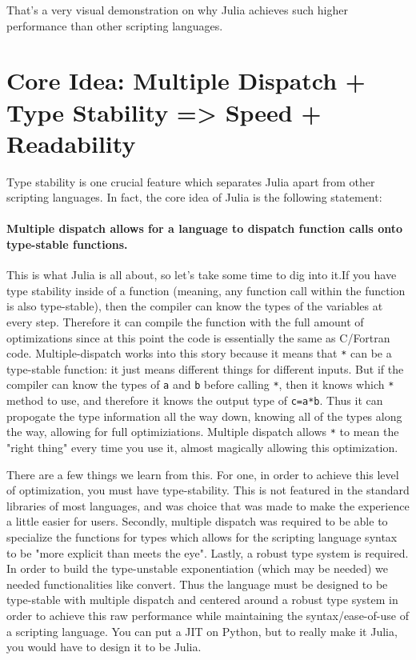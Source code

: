 \documentclass[11pt]{article}
\begin{document}
    That's a very visual demonstration on why Julia achieves such higher
performance than other scripting languages.

    \section{Core Idea: Multiple Dispatch + Type Stability =\textgreater{}
Speed +
Readability}\label{core-idea-multiple-dispatch-type-stability-speed-readability}

Type stability is one crucial feature which separates Julia apart from
other scripting languages. In fact, the core idea of Julia is the
following statement:

\paragraph{Multiple dispatch allows for a language to dispatch function
calls onto type-stable
functions.}\label{multiple-dispatch-allows-for-a-language-to-dispatch-function-calls-onto-type-stable-functions.}

This is what Julia is all about, so let's take some time to dig into
it.If you have type stability inside of a function (meaning, any
function call within the function is also type-stable), then the
compiler can know the types of the variables at every step. Therefore it
can compile the function with the full amount of optimizations since at
this point the code is essentially the same as C/Fortran code.
Multiple-dispatch works into this story because it means that \texttt{*}
can be a type-stable function: it just means different things for
different inputs. But if the compiler can know the types of \texttt{a}
and \texttt{b} before calling \texttt{*}, then it knows which \texttt{*}
method to use, and therefore it knows the output type of \texttt{c=a*b}.
Thus it can propogate the type information all the way down, knowing all
of the types along the way, allowing for full optimiziations. Multiple
dispatch allows \texttt{*} to mean the "right thing" every time you use
it, almost magically allowing this optimization.

There are a few things we learn from this. For one, in order to achieve
this level of optimization, you must have type-stability. This is not
featured in the standard libraries of most languages, and was choice
that was made to make the experience a little easier for users.
Secondly, multiple dispatch was required to be able to specialize the
functions for types which allows for the scripting language syntax to be
"more explicit than meets the eye". Lastly, a robust type system is
required. In order to build the type-unstable exponentiation (which may
be needed) we needed functionalities like convert. Thus the language
must be designed to be type-stable with multiple dispatch and centered
around a robust type system in order to achieve this raw performance
while maintaining the syntax/ease-of-use of a scripting language. You
can put a JIT on Python, but to really make it Julia, you would have to
design it to be Julia.
\end{document}
